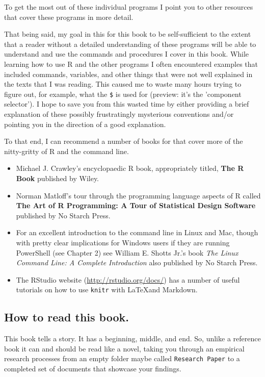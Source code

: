 \documentclass[ChapterTOCs,krantz1]{krantz}\usepackage{graphicx, color}
\begin{document}
To get the most out of these individual programs I point you to other
resources that cover these programs in more detail.

That being said, my goal in this for this book to be self-sufficient to
the extent that a reader without a detailed understanding of these
programs will be able to understand and use the commands and procedures
I cover in this book. While learning how to use R and the other
programs I often encountered examples that included commands, variables,
and other things that were not well explained in the texts that I was
reading. This caused me to waste many hours trying to figure out, for
example, what the \texttt{\$} is used for (preview: it's the 'component selector'). I hope to save
you from this wasted time by either providing a brief explanation of
these possibly frustratingly mysterious conventions and/or pointing you
in the direction of a good explanation.

To that end, I can recommend a number of books for that cover more of
the nitty-gritty of R and the command line.

\begin{itemize}
\item
  Michael J. Crawley's encyclopaedic R book, appropriately
  titled, \textbf{The R Book} published by Wiley.
\item
  Norman Matloff's tour through the programming language aspects of
  R called \textbf{The Art of R Programming: A Tour of
  Statistical Design Software} published by No Starch Press.
\item
  For an excellent introduction to the command line in Linux and Mac,
  though with pretty clear implications for Windows users if they are
  running PowerShell (see Chapter 2) see William E. Shotts
  Jr.'s book \emph{The Linux Command Line: A Complete Introduction} also
  published by No Starch Press.
\item
  The RStudio website (\url{http://rstudio.org/docs/}) has a
  number of useful tutorials on how to use \texttt{knitr} with
  \LaTeX and Markdown.
\end{itemize}
\subsection{How to read this book.}

This book tells a story. It has a beginning, middle, and end. So, unlike
a reference book it can and should be read like a novel, taking you
through an empirical research processes from an empty folder maybe
called \texttt{Research Paper} to a completed set of documents that
showcase your findings.
\end{document}
